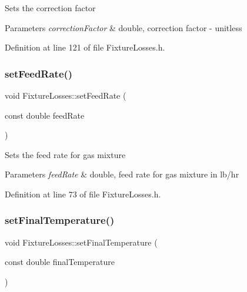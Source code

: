 Sets the correction factor 
\begin{DoxyParams}{Parameters}
{\em correction\+Factor} & double, correction factor -\/ unitless \\
\hline
\end{DoxyParams}


Definition at line 121 of file Fixture\+Losses.\+h.

\mbox{\label{class_fixture_losses_a6543643db6b28f3a78397c97d9c5135f}} 
\subsubsection{\texorpdfstring{set\+Feed\+Rate()}{setFeedRate()}}
{\footnotesize\ttfamily void Fixture\+Losses\+::set\+Feed\+Rate (\begin{DoxyParamCaption}\item[{const double}]{feed\+Rate }\end{DoxyParamCaption})\hspace{0.3cm}{\ttfamily [inline]}}

Sets the feed rate for gas mixture 
\begin{DoxyParams}{Parameters}
{\em feed\+Rate} & double, feed rate for gas mixture in lb/hr \\
\hline
\end{DoxyParams}


Definition at line 73 of file Fixture\+Losses.\+h.

\mbox{\label{class_fixture_losses_a5b65e7118cb96c4f4c88c0d6d1a4f6d3}} 
\subsubsection{\texorpdfstring{set\+Final\+Temperature()}{setFinalTemperature()}}
{\footnotesize\ttfamily void Fixture\+Losses\+::set\+Final\+Temperature (\begin{DoxyParamCaption}\item[{const double}]{final\+Temperature }\end{DoxyParamCaption})\hspace{0.3cm}{\ttfamily [inline]}}

